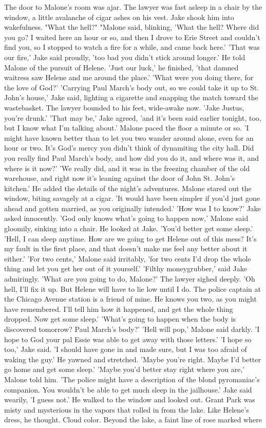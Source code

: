\documentclass{novel}
\begin{document}
The door to Malone’s room was ajar. The lawyer was fast asleep in a chair by the window, a little avalanche of cigar ashes on his vest. Jake shook him into wakefulness. "What the hell?" "Malone said, blinking, 'What the hell? Where did you go? I waited here an hour or so, and then I drove to Erie Street and couldn’t find you, so I stopped to watch a fire for a while, and came back here.' 'That was our fire,' Jake said proudly, 'too bad you didn’t stick around longer.' He told Malone of the pursuit of Helene. 'Just our luck,' he finished, 'that damned waitress saw Helene and me around the place.' 'What were you doing there, for the love of God?' 'Carrying Paul March’s body out, so we could take it up to St. John’s house,' Jake said, lighting a cigarette and snapping the match toward the wastebasket. The lawyer bounded to his feet, wide-awake now. 'Jake Justus, you’re drunk.' 'That may be,' Jake agreed, 'and it’s been said earlier tonight, too, but I know what I’m talking about.' Malone paced the floor a minute or so. 'I might have known better than to let you two wander around alone, even for an hour or two. It’s God’s mercy you didn’t think of dynamiting the city hall. Did you really find Paul March’s body, and how did you do it, and where was it, and where is it now?' 'We really did, and it was in the freezing chamber of the old warehouse, and right now it’s leaning against the door of John St. John’s kitchen.' He added the details of the night’s adventures. Malone stared out the window, biting savagely at a cigar. 'It would have been simpler if you’d just gone ahead and gotten married, as you originally intended.' 'How was I to know?' Jake asked innocently. 'God only knows what’s going to happen now,' Malone said gloomily, sinking into a chair. He looked at Jake. 'You’d better get some sleep.' 'Hell, I can sleep anytime. How are we going to get Helene out of this mess? It’s my fault in the first place, and that doesn’t make me feel any better about it either.' 'For two cents,' Malone said irritably, 'for two cents I’d drop the whole thing and let you get her out of it yourself.' 'Filthy moneygrubber,' said Jake admiringly. 'What are you going to do, Malone?' The lawyer sighed deeply. 'Oh hell, I’ll fix it up. But Helene will have to lie low until I do. The police captain at the Chicago Avenue station is a friend of mine. He knows you two, as you might have remembered. I’ll tell him how it happened, and get the whole thing dropped. Now get some sleep.' 'What’s going to happen when the body is discovered tomorrow? Paul March’s body?' 'Hell will pop,' Malone said darkly. 'I hope to God your pal Essie was able to get away with those letters.' 'I hope so too,' Jake said. 'I should have gone in and made sure, but I was too afraid of waking the guy.' He yawned and stretched. 'Maybe you’re right. Maybe I’d better go home and get some sleep.' 'Maybe you’d better stay right where you are,' Malone told him. 'The police might have a description of the blond pyromaniac’s companion. You wouldn’t be able to get much sleep in the jailhouse.' Jake said wearily, 'I guess not.' He walked to the window and looked out. Grant Park was misty and mysterious in the vapors that rolled in from the lake. Like Helene’s dress, he thought. Cloud color. Beyond the lake, a faint line of rose marked where 
\end{document}
